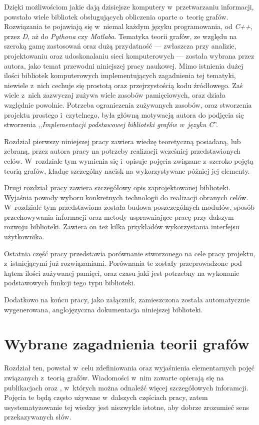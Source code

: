 \documentclass[a4paper,12pt,polish,oneside,openright]{thesis}
\begin{document}
Dzięki możliwościom jakie dają dzisiejsze komputery w~przetwarzaniu informacji, powstało wiele bibliotek obsługujących obliczenia oparte o~teorię grafów.
Rozwiązania te pojawiają się w~niemal każdym języku programowania, od \emph{C++}, przez \emph{D}, aż do \emph{Pythona} czy \emph{Matlaba}.
Tematyka teorii grafów, ze względu na szeroką gamę zastosowań oraz dużą przydatność --- zwłaszcza przy analizie, projektowaniu oraz udoskonalaniu sieci komputerowych --- została wybrana przez autora, jako temat przewodni niniejszej pracy naukowej.
Mimo istnienia dużej ilości bibliotek komputerowych implementujących zagadnienia tej tematyki, niewiele z~nich cechuje się prostotą oraz przejrzystością kodu źródłowego.
Zaś wiele z~nich zazwyczaj zużywa wiele zasobów pamięciowych, oraz działa względnie powolnie.
Potrzeba ograniczenia zużywanych zasobów, oraz stworzenia projektu prostego i~czytelnego, była główną motywacją autora do podjęcia się stworzenia ,,\emph{Implementacji podstawowej biblioteki grafów w~języku C}''.

Rozdział pierwszy niniejszej pracy zawiera wiedzę teoretyczną posiadaną, lub zebraną, przez autora pracy na potrzeby realizacji wcześniej przedstawionych celów.
W~rozdziale tym wymienia się i~opisuje pojęcia związane z~szeroko pojętą teorią grafów, kładąc szczególny nacisk na wykorzystywane później jej elementy.

Drugi rozdział pracy zawiera szczegółowy opis zaprojektowanej biblioteki.
Wyjaśnia powody wyboru konkretnych technologii do realizacji obranych celów.
W~rozdziale tym przedstawiona została budowa poszczególnych modułów, sposób przechowywania informacji oraz metody usprawniające pracę przy dalszym rozwoju biblioteki.
Zawiera on też kilka przykładów wykorzystania interfejsu użytkownika.

Ostatnia część pracy przedstawia porównanie stworzonego na cele pracy projektu, z~istniejącymi już rozwiązaniami.
Porównania te zostały przeprowadzone pod kątem ilości zużywanej pamięci, oraz czasu jaki jest potrzebny na wykonanie podstawowych funkcji tego typu biblioteki.

Dodatkowo na końcu pracy, jako załącznik, zamieszczona została automatycznie wygenerowana, anglojęzyczna dokumentacja niniejszej biblioteki.

\chapter{Wybrane zagadnienia teorii grafów}
Rozdział ten, powstał w~celu zdefiniowania oraz wyjaśnienia elementarnych pojęć związanych z~teorią grafów. Wiadomości w~nim zawarte opierają się na publikacjach \cite{graphtheory} oraz \cite{graphtheory2}, w~których można odnaleźć więcej szczegółowych inforamcji.
Pojęcia te będą często używane w~dalszych częściach pracy, zatem usystematyzowanie tej wiedzy jest niezwykle istotne, aby dobrze zrozumieć sens przekazywanych słów.
\end{document}
